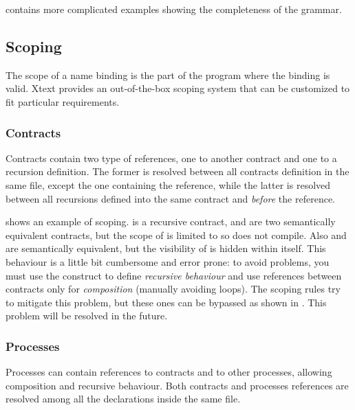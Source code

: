  contains more complicated examples showing the completeness of the grammar.

\subsection{Scoping}
The scope of a name binding is the part of the program where the binding is valid. Xtext provides an out-of-the-box scoping system that can be customized to fit particular requirements. 

\subsubsection{Contracts}
Contracts contain two type of references, one to another contract and one to a recursion definition. The former is resolved between all contracts definition in the same file, except the one containing the reference, while the latter is resolved between all recursions defined into the same contract and \emph{before} the reference.

 shows an example of scoping.  is a recursive contract,  and  are two semantically equivalent contracts, but the scope of  is limited to  so  does not compile.
Also  and  are semantically equivalent, but the visibility of  is hidden within  itself.
%
This behaviour is a little bit cumbersome and error prone: to avoid problems, you must use the  construct to define \textit{recursive behaviour} and use references between contracts only for \textit{composition} (manually avoiding loops). The scoping rules try to mitigate this problem, but these ones can be bypassed as shown in . This problem will be resolved in the future.



\subsubsection{Processes}
Processes can contain references to contracts and to other processes, allowing composition and recursive behaviour. Both contracts and processes references are resolved among all the declarations inside the same file.



